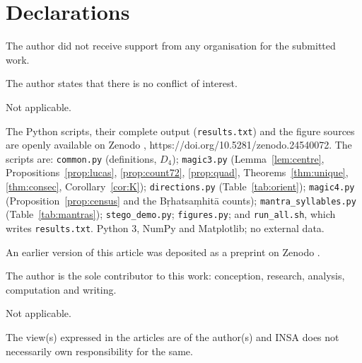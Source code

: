 \documentclass[pdflatex,sn-basic]{sn-jnl}
\theoremstyle{thmstyleone}
\theoremstyle{thmstylethree}
\begin{document}
\backmatter

\section*{Declarations}

 The author did not receive support from any organisation for the submitted work.

 The author states that there is no conflict of interest.

 Not applicable.

 The Python scripts, their complete output (\texttt{results.txt}) and the figure sources are openly available on Zenodo \citep{varma2026zenodo}, https://doi.org/10.5281/zenodo.24540072. The scripts are: \texttt{common.py} (definitions, $D_4$); \texttt{magic3.py} (Lemma~\ref{lem:centre}, Propositions~\ref{prop:lucas}, \ref{prop:count72}, \ref{prop:quad}, Theorems~\ref{thm:unique}, \ref{thm:consec}, Corollary~\ref{cor:K}); \texttt{directions.py} (Table~\ref{tab:orient}); \texttt{magic4.py} (Proposition~\ref{prop:census} and the B\d rhatsa\d mhit\=a counts); \texttt{mantra\_syllables.py} (Table~\ref{tab:mantras}); \texttt{stego\_demo.py}; \texttt{figures.py}; and \texttt{run\_all.sh}, which writes \texttt{results.txt}. Python 3, NumPy and Matplotlib; no external data.

 An earlier version of this article was deposited as a preprint on Zenodo \citep{varma2026zenodo}.

 The author is the sole contributor to this work: conception, research, analysis, computation and writing.

 Not applicable.

 The view(s) expressed in the articles are of the author(s) and INSA does not necessarily own responsibility for the same.


\end{document}
